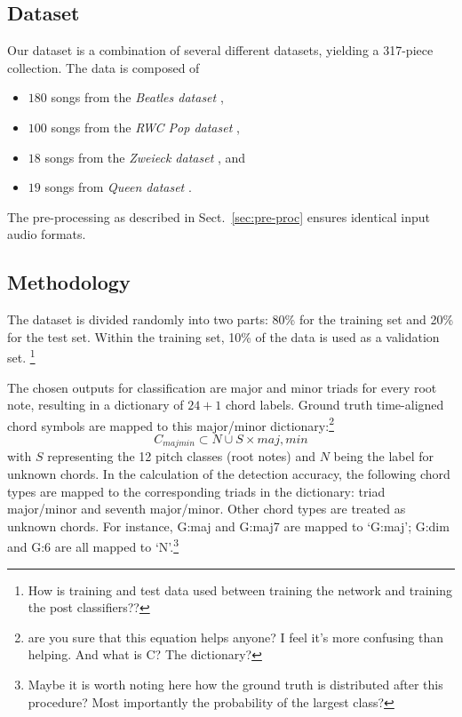 \documentclass{article}
\begin{document}
\subsection{Dataset}
Our dataset is a combination of several different datasets, yielding a 317-piece collection. The data is composed of 
\begin{itemize}
	\item   $180$ songs from the \textit{Beatles dataset} \cite{mauch2009omras2},
    \item   $100$ songs from the \textit{RWC Pop dataset} \cite{goto2002rwc}, 
    \item   $18$ songs from the \textit{Zweieck dataset} \cite{mauch2009omras2}, and 
    \item   $19$ songs from \textit{Queen dataset} \cite{mauch2009omras2}.
\end{itemize}  
The pre-processing as described in Sect.~\ref{sec:pre-proc} ensures identical input audio formats.

\subsection{Methodology}

The dataset is divided randomly into two parts: 80\% for the training set and 20\% for the test set. Within the training set, 10\% of the data is used as a validation set. \footnote{How is training and test data used between training the network and training the post classifiers??}

The chosen outputs for classification are major and minor triads for every root note, resulting in a dictionary of $24+1$ chord labels.
Ground truth time-aligned chord symbols are mapped to this major/minor dictionary:\footnote{are you sure that this equation helps anyone? I feel it's more confusing than helping. And what is C? The dictionary?}
\begin{equation}
C_{majmin} \subset {N} \cup S \times {maj,min}
\end{equation}
with $S$ representing the 12 pitch classes (root notes) and $N$ being the label for unknown chords. In the calculation of the detection accuracy, the following chord types are mapped to the corresponding triads in the dictionary: triad major/minor and seventh major/minor. Other chord types are treated as unknown chords. For instance, G:maj and G:maj7 are mapped to `G:maj'; G:dim and G:6 are all mapped to `N'.\footnote{Maybe it is worth noting here how the ground truth is distributed after this procedure? Most importantly the probability of the largest class?}
\end{document}
